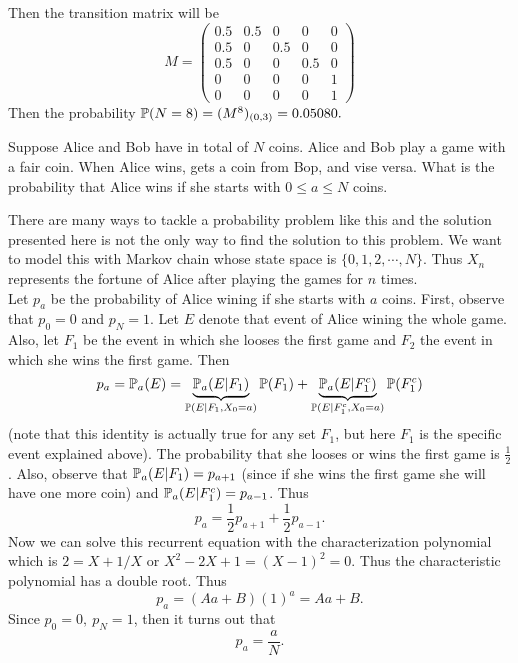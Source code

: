 \begin{example}
\begin{solution}
\begin{center}
\begin{tikzpicture}[->,>=stealth',shorten >=1pt,auto,node distance=2cm,
			semithick,scale=0.7]
			
		\end{tikzpicture}
	\end{center}
	Then the transition matrix will be
	\[
	M = \begin{pmatrix}
		0.5 & 0.5 & 0 & 0 & 0 \\
		0.5 & 0 & 0.5 & 0 & 0 \\
		0.5 & 0 & 0 & 0.5 & 0 \\
		0 & 0 & 0 & 0 & 1 \\
		0 & 0 & 0 & 0 & 1
	\end{pmatrix}
	\]
	Then the probability $\prob(N=8) = (M^8)_{(0,3)} = 0.05080.$
	\end{solution}
\end{example}


\begin{example}
	Suppose Alice and Bob have in total of $N$ coins. Alice and Bob play a game with a fair coin. When Alice wins, gets a coin from Bop, and vise versa. What is the probability that Alice wins if she starts with $0\leq a \leq N$ coins.
	
	\begin{solution}
		There are many ways to tackle a probability problem like this and the solution presented here is not the only way to find the solution to this problem. We want to model this with Markov chain whose state space is $\{0,1,2,\cdots,N\}$. Thus $X_n$ represents the fortune of Alice after playing the games for $n$ times. 
		 \\
		Let $p_a$ be the probability of Alice wining if she starts with $a$ coins. First, observe that $p_0 = 0$ and $p_N= 1$. Let $E$ denote that event of Alice wining the whole game. Also, let $F_1$ be the event in which she looses the first game and $F_2$ the event in which she wins the first game. Then
		\[ p_a = \prob_a(E) =  \underbrace{\prob_a(E | F_1)}_{\prob(E|F_1,X_0=a)} \prob(F_1) + \underbrace{\prob_a(E|F_1^c)}_{\prob(E|F_1^c,X_0=a)}\prob(F_1^c) \]
		(note that this identity is actually true for any set $F_1$, but here $F_1$ is the specific event explained above). The probability that she looses or wins the first game is $\frac{1}{2}$. Also, observe that $\prob_a(E|F_1) = p_{a+1}$ (since if she wins the first game she will have one more coin) and $\prob_a(E|F_1^c) = p_{a-1}$. Thus 
		\[ p_a = \frac{1}{2}p_{a+1} + \frac{1}{2}p_{a-1}. \]
		Now we can solve this recurrent equation with the characterization polynomial which is $2 = X + 1/X$ or $X^2 - 2X + 1 = (X-1)^2 = 0$. Thus the characteristic polynomial has a double root. Thus 
		\[ p_a = (Aa + B)(1)^a = Aa + B. \]
		Since $p_0 = 0,\ p_N =1$, then it turns out that
		\[ p_a = \frac{a}{N}. \]
	\end{solution}
\end{example}

